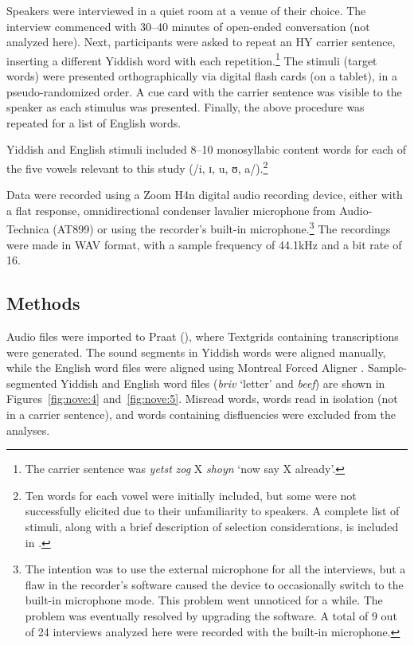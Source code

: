 \documentclass[output=paper]{langsci/langscibook}
\begin{document}
Speakers were interviewed in a quiet room at a venue of their choice. The interview commenced with 30--40 minutes of open-ended conversation (not analyzed here). Next, participants were asked to repeat an HY carrier sentence, inserting a different Yiddish word with each repetition.\footnote{The carrier sentence was \textit{yetst} \textit{zog} X \textit{shoyn} ‘now say X already’.} The stimuli (target words) were presented orthographically via digital flash cards (on a tablet), in a pseudo-randomized order. A cue card with the carrier sentence was visible to the speaker as each stimulus was presented. Finally, the above procedure was repeated for a list of English words. 

Yiddish and English stimuli included 8--10 monosyllabic content words for each of the five vowels relevant to this study (/i, ɪ, u, ʊ, a/).\footnote{Ten words for each vowel were initially included, but some were not successfully elicited due to their unfamiliarity to speakers. A complete list of stimuli, along with a brief description of selection considerations, is included in .}

Data were recorded using a Zoom H4n digital audio recording device, either with a flat response, omnidirectional condenser lavalier microphone from Audio-Technica (AT899) or using the recorder’s built-in microphone.\footnote{The intention was to use the external microphone for all the interviews, but a flaw in the recorder’s software caused the device to occasionally switch to the built-in microphone mode. This problem went unnoticed for a while. The problem was eventually resolved by upgrading the software. A total of 9 out of 24 interviews analyzed here were recorded with the built-in microphone.} The recordings were made in WAV format, with a sample frequency of 44.1kHz and a bit rate of 16.


 
 \subsection{Methods}
\label{sec:nove:4.2}
\largerpage[2]

Audio files were imported to Praat (\citealt{BoersmaWeenink2018}), where Textgrids containing transcriptions were generated. The sound segments in Yiddish words were aligned manually, while the English word files were aligned using Montreal Forced Aligner \citep{McAuliffeEtAl2017}. Sample-segmented Yiddish and English word files (\textit{briv} ‘letter’ and \textit{beef}) are shown in Figures~\ref{fig:nove:4} and~\ref{fig:nove:5}. Misread words, words read in isolation (not in a carrier sentence), and words containing disfluencies were excluded from the analyses.
\end{document}
